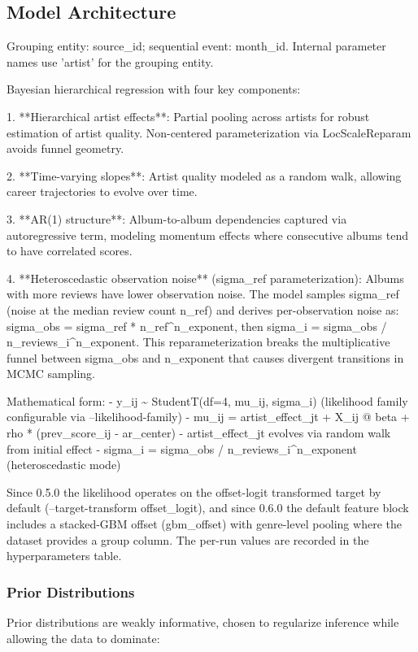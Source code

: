 \documentclass{article}
\begin{document}
\subsection*{Model Architecture}
Grouping entity: source\_id; sequential event: month\_id. Internal parameter names use 'artist' for the grouping entity.

Bayesian hierarchical regression with four key components:

1. **Hierarchical artist effects**: Partial pooling across artists for robust estimation of artist quality. Non-centered parameterization via LocScaleReparam avoids funnel geometry.

2. **Time-varying slopes**: Artist quality modeled as a random walk, allowing career trajectories to evolve over time.

3. **AR(1) structure**: Album-to-album dependencies captured via autoregressive term, modeling momentum effects where consecutive albums tend to have correlated scores.

4. **Heteroscedastic observation noise** (sigma\_ref parameterization): Albums with more reviews have lower observation noise. The model samples sigma\_ref (noise at the median review count n\_ref) and derives per-observation noise as: sigma\_obs = sigma\_ref * n\_ref\textasciicircum{}n\_exponent, then sigma\_i = sigma\_obs / n\_reviews\_i\textasciicircum{}n\_exponent. This reparameterization breaks the multiplicative funnel between sigma\_obs and n\_exponent that causes divergent transitions in MCMC sampling.

Mathematical form:
- y\_ij \textasciitilde{} StudentT(df=4, mu\_ij, sigma\_i) (likelihood family configurable via --likelihood-family)
- mu\_ij = artist\_effect\_jt + X\_ij @ beta + rho * (prev\_score\_ij - ar\_center)
- artist\_effect\_jt evolves via random walk from initial effect
- sigma\_i = sigma\_obs / n\_reviews\_i\textasciicircum{}n\_exponent (heteroscedastic mode)

Since 0.5.0 the likelihood operates on the offset-logit transformed target by default (--target-transform offset\_logit), and since 0.6.0 the default feature block includes a stacked-GBM offset (gbm\_offset) with genre-level pooling where the dataset provides a group column. The per-run values are recorded in the hyperparameters table.

\subsubsection*{Prior Distributions}
Prior distributions are weakly informative, chosen to regularize inference while allowing the data to dominate:
\end{document}
